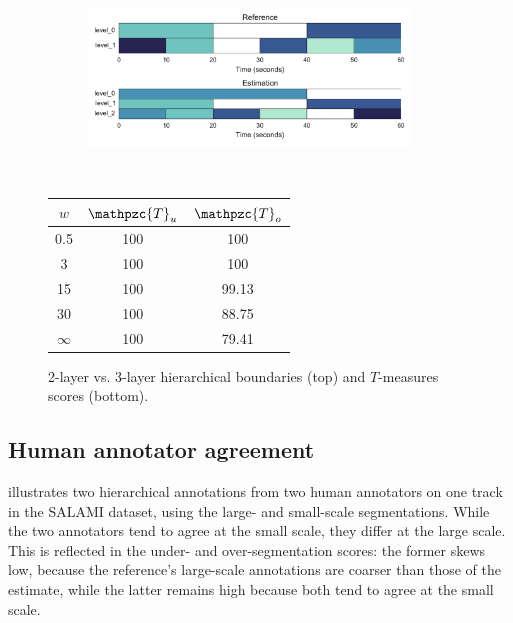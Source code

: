 \documentclass{article}
\def\shag{\ensuremath{\mathpzc{T}}}
\begin{document}
\begin{figure}[t]
  \centering
  \begin{subfigure}{0.5\textwidth}
    \centering
    \includegraphics[width=0.94\textwidth]{figs/hier-hiercomp.pdf}
  \end{subfigure}%
  \\
  \begin{minipage}{0.5\textwidth}
    \centering
    \vspace{10pt}
    \begin{tabular}{|c|c|c|}
      \hline
      $w$       & $\shag_u$       & $\shag_o$      \\
      \hline
      0.5       & 100       & 100      \\     
      3         & 100       & 100      \\
      15        & 100       & 99.13    \\
      30        & 100       & 88.75    \\
      $\infty$  & 100       & 79.41    \\
      \hline
    \end{tabular}
  \end{minipage}
  \caption{2-layer vs. 3-layer hierarchical boundaries (top) and $T$-measures scores (bottom).}
  \label{fig:hier-hiercomp}
\end{figure}


\subsection{Human annotator agreement}
 illustrates two hierarchical annotations from two human annotators on one track in
the SALAMI dataset, using the large- and small-scale segmentations.
While the two annotators tend to agree at the small scale, they differ at the large scale.
This is reflected in the under- and over-segmentation scores: the former skews low, because the reference's large-scale annotations are coarser than those of the estimate, while the latter remains high because both tend to agree at the small scale.
\end{document}
